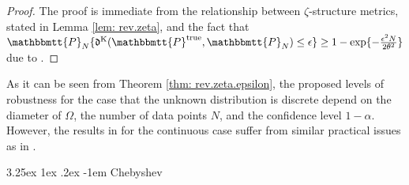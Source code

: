 \documentclass[final,onefignum,onetabnum]{class}
\makeatletter
\renewcommand\paragraph{\@startsection{paragraph}{4}{\z@}%
  {3.25ex \@plus1ex \@minus.2ex}%
  {-1em}%
  {\normalfont\normalsize\bfseries}}
\newcommand{\Ts}[1]{\mathbbmtt{#1}} %
\newcommand{\Fs}[1]{\mathfrak{#1}} %
\newcommand{\trueP}{\Ts{P}^{\text{true}}}
\makeatother
\begin{document}
\begin{proof}
    The proof is immediate from the relationship between $\zeta$-structure metrics, stated in Lemma \ref{lem: rev.zeta}, and the fact that \linebreak $\Ts{P}_{N}\{\Fs{d}^{\text{K}} (\trueP, \Ts{P}_{N}) \le \epsilon \} \ge 1- \exp\{-\frac{\epsilon^{2}N}{2 \theta^{2}}\}$ due to \citet[Proposition~3]{zhao2015}. 
\end{proof}
As it can be seen from Theorem \ref{thm: rev.zeta.epsilon}, the proposed levels of robustness for the case that the unknown distribution is discrete depend on the diameter of $\Omega$, the number of data points $N$, and the confidence level $1-\alpha$.
However, the results in \citet{zhao2015} for the continuous case suffer from similar practical issues as in  \citep{pflug2007,pflug2012,jiang2018}. 

\paragraph{Chebyshev}
\end{document}
